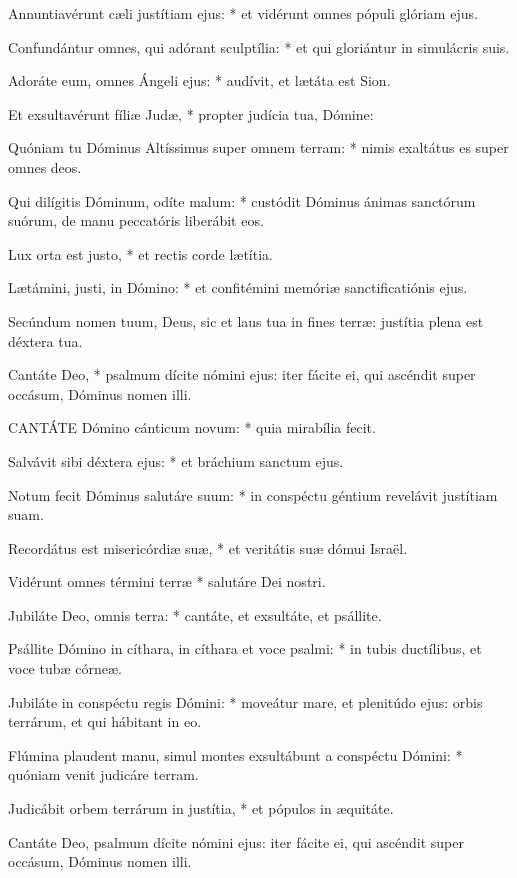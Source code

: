 Annuntiavérunt cæli justítiam ejus: * et vidérunt omnes pópuli glóriam ejus.

Confundántur omnes, qui adórant sculptília: * et qui gloriántur in simulácris suis.

Adoráte eum, omnes Ángeli ejus: * audívit, et lætáta est Sion.

Et exsultavérunt fíliæ Judæ, * propter judícia tua, Dómine:

Quóniam tu Dóminus Altíssimus super omnem terram: * nimis exaltátus es super omnes deos.

Qui dilígitis Dóminum, odíte malum: * custódit Dóminus ánimas sanctórum suórum, de manu peccatóris liberábit eos.

Lux orta est justo, * et rectis corde lætítia.

Lætámini, justi, in Dómino: * et confitémini memóriæ sanctificatiónis ejus.

 Secúndum nomen tuum, Deus, sic et laus tua in fines terræ: justítia plena est déxtera tua.

 Cantáte Deo, * psalmum dícite nómini ejus: iter fácite ei, qui ascéndit super occásum, Dóminus nomen illi.


\lettrine[lines=2]{C}{ANTÁTE} Dómino cánticum novum: * quia mirabília fecit.

Salvávit sibi déxtera ejus: * et bráchium sanctum ejus.

Notum fecit Dóminus salutáre suum: * in conspéctu géntium revelávit justítiam suam.

Recordátus est misericórdiæ suæ, * et veritátis suæ dómui Israël.

Vidérunt omnes términi terræ * salutáre Dei nostri.

Jubiláte Deo, omnis terra: * cantáte, et exsultáte, et psállite.

Psállite Dómino in cíthara, in cíthara et voce psalmi: * in tubis ductílibus, et voce tubæ córneæ.

Jubiláte in conspéctu regis Dómini: * moveátur mare, et plenitúdo ejus: orbis terrárum, et qui hábitant in eo.

Flúmina plaudent manu, simul montes exsultábunt a conspéctu Dómini: * quóniam venit judicáre terram.

Judicábit orbem terrárum in justítia, * et pópulos in æquitáte.

 Cantáte Deo, psalmum dícite nómini ejus: iter fácite ei, qui ascéndit super occásum, Dóminus nomen illi.

